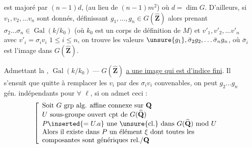est majoré par $(n-1)d$, (au lieu de $(n-1)m^2$) où $d=\dim G$.  D'ailleurs, si $v_1,v_2,\ldots v_n$ sont donnés,   définissant $g_1,\ldots,g_n\in G(\widehat{\mathbf Z})$ alors prenant $\sigma_2\ldots\sigma_n\in\operatorname{Gal}(k/k_0)$ (où $k_0$ est un corps de définition  de $M$) et $v'_1,v'_2,\ldots v'_n$ avec $v'_i=\sigma_i v_i$ $1\leq i\leq n$, on trouve les valeurs $\unsure{g_1},\bar\sigma_2g_2,\ldots\bar\sigma_ng_n$, où $\bar\sigma_i$ est l'image dans $G(\widehat{\mathbf Z})$. 

Admettant la , $\operatorname{Gal}(k/k_0)\mathbin{\text{---}}G(\widehat{\mathbf Z})$ \uline{a une image qui est d'indice fini}. Il s'ensuit que quitte à remplacer les $v_i$ par des $\sigma_i v_i$ convenables, on peut   $g_2\ldots g_n$ gén. indépendants pour \uline{$\forall$} $\ell$, si on admet ceci :
\[
\left[\begin{array}{l}
\text{Soit }G\text{ grp alg. affine connexe sur }\mathbf Q\\
U\text{ sous-groupe ouvert cpt de }G(\widehat{\mathbf Q})\\
P\inserted{=U.a}\text{ une \unsure{cl.} dans }G(\widehat{\mathbf Q})\text{ mod }U\\
\text{Alors il existe dans }P\text{ un élément }\xi\text{ dont toutes les}\\
\text{composantes sont génériques rel./}\mathbf Q
\end{array}\right.
\]
